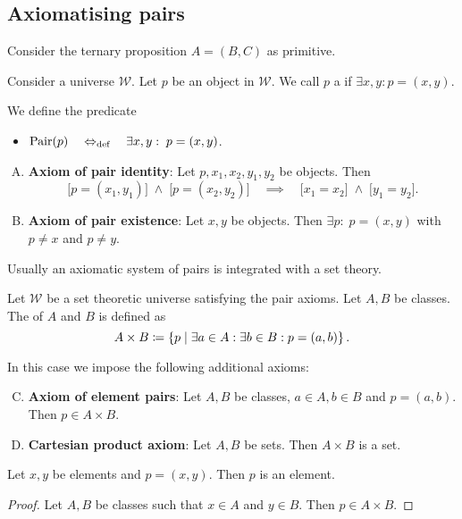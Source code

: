 \subsection{Axiomatising pairs}
Consider the ternary proposition $A = (B,C)$ as primitive. 
\begin{definition}
Consider a universe $\mathcal{W}$. Let $p$ be an object in $\mathcal{W}$. We call $p$ a  if $\exists x,y: p = (x,y)$.

We define the predicate
\begin{itemize}
\item $\operatorname{Pair}(p) \quad\Leftrightarrow_{\text{def}}\quad \exists x,y: \; p = (x, y)$.
\end{itemize}
\end{definition}

\begin{enumerate}[(A)] \setcounter{enumi}{0}
\item \textbf{Axiom of pair identity}: Let $p,x_1,x_2,y_1,y_2$ be objects. Then
\[ \big[p = (x_1, y_1)\big] \;\land\; \big[p = (x_2, y_2)\big] \quad\implies\quad \big[x_1 = x_2\big] \;\land\; \big[y_1 = y_2\big]. \]
\item \textbf{Axiom of pair existence}: Let $x,y$ be objects. Then $\exists p: \; p = (x,y)$ with $p\neq x $ and $p \neq y$.
\end{enumerate}

Usually an axiomatic system of pairs is integrated with a set theory.
\begin{definition}
Let $\mathcal{W}$ be a set theoretic universe satisfying the pair axioms. Let $A,B$ be classes. The  of $A$ and $B$ is defined as
\[ A\times B \coloneqq \left\{ p \;\middle|\; \exists a\in A: \exists b\in B: p = (a,b) \right\}. \]
\end{definition}

In this case we impose the following additional axioms:
\begin{enumerate}[(A)] \setcounter{enumi}{2}
\item \textbf{Axiom of element pairs}: Let $A,B$ be classes, $a\in A, b\in B$ and $p = (a,b)$. Then $p\in A\times B$.
\item \textbf{Cartesian product axiom}: Let $A,B$ be sets. Then $A \times B$ is a set.
\end{enumerate}

\begin{lemma}
Let $x,y$ be elements and $p = (x,y)$. Then $p$ is an element.
\end{lemma}
\begin{proof}
Let $A,B$ be classes such that $x\in A$ and $y\in B$. Then $p \in A\times B$.
\end{proof}

